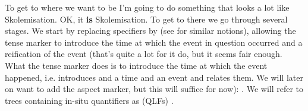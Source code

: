 \documentclass[11pt,a4paper]{article}
\begin{document}
\begin{figure}[ht!]
\hspace*{\fill}
\begin{minipage}[t]{0.45\linewidth}
\end{minipage}
\hspace*{\fill}
\caption{}\label{some accountant is a crook .}
\end{figure}

To get to where we want to be I'm going to do something that looks a
lot like Skolemisation. OK, it \textbf{is} Skolemisation. To get to
there we go through several stages. We start by replacing specifiers
by  \citep{Milward:94} (see 
\citep{Cooper:83,Keller:87,Vestre:91} for similar
notions), allowing the tense marker to introduce the time at which the
event in question occurred and a reification of the event (that's
quite a lot for it do, but it seems fair enough. What the tense marker
does is to introduce the time at which the event happened,
i.e. introduces and a time and an event and relates them. We will
later on want to add the aspect marker, but this will suffice for now): 
. We will refer to trees containing
in-situ quantifiers as  (QLFs) \citep{vanEijck:92}.
\end{document}
